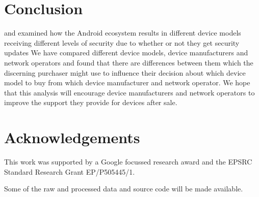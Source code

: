 \documentclass{sig-alternate}
\newcommand{\identifying}[1]{#1}%
\begin{document}
\cite{Nappa2015}
\cite{Zhang2014}
\cite{Lindorfer2014}
\cite{Arp2014}

\section{Conclusion}
 and examined how the Android ecosystem results in different device models receiving different levels of security due to whether or not they get security updates
We have compared different device models, device manufacturers and network operators and found that there are differences between them which the discerning purchaser might use to influence their decision about which device model to buy from which device manufacturer and network operator.
We hope that this analysis will encourage device manufacturers and network operators to improve the support they provide for devices after sale.

\sloppy
\section*{Acknowledgements}
\identifying{
This work was supported by a Google focussed research award and the EPSRC Standard Research Grant EP/P505445/1.
}
Some of the raw and processed data and source code will be made available.


\printbibliography
\end{document}
